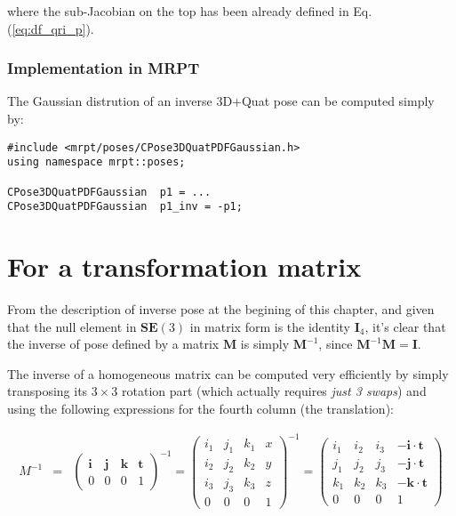\documentclass[a4paper,11pt]{report}
\begin{document}
\noindent where the sub-Jacobian on the top has been already defined in Eq.(\ref{eq:df_qri_p}).



\subsubsection{Implementation in MRPT}

The Gaussian distrution of an inverse 3D+Quat pose can be computed simply by:

\begin{lstlisting}
#include <mrpt/poses/CPose3DQuatPDFGaussian.h>
using namespace mrpt::poses;

CPose3DQuatPDFGaussian  p1 = ...
CPose3DQuatPDFGaussian  p1_inv = -p1;
\end{lstlisting}



\section{For a transformation matrix}
\label{sect:inverse:mat}

From the description of inverse pose at the begining of this chapter, and given
that the null element in $\mathbf{SE}(3)$ in matrix form is the identity $\mathbf{I}_4$,
it's clear that the inverse of pose defined by a matrix $\mathbf{M}$ is simply $\mathbf{M}^{-1}$,
since $\mathbf{M}^{-1}\mathbf{M}=\mathbf{I}$.

The inverse of a homogeneous matrix can be computed very efficiently by
simply transposing its $3 \times 3$ rotation part (which actually requires \emph{just 3 swaps})
and using the following expressions for the fourth column (the translation):

\begin{eqnarray}
M^{-1} &=&
\left(
  \begin{array}{ccc|c}
   \mathbf{i} & \mathbf{j} & \mathbf{k} & \mathbf{t} \\
\hline
   0 & 0 & 0 & 1
  \end{array}
\right) ^{-1}
=
\left(
  \begin{array}{ccc|c}
   i_1 & j_1 & k_1 & x \\
   i_2 & j_2 & k_2 & y \\
   i_3 & j_3 & k_3 & z \\
\hline
   0 & 0 & 0 & 1
  \end{array}
\right) ^{-1}
=
\left(
  \begin{array}{ccc|c}
   i_1 & i_2 & i_3   & -\mathbf{i} \cdot \mathbf{t} \\
   j_1 & j_2 & j_3   & -\mathbf{j} \cdot \mathbf{t} \\
   k_1 & k_2 & k_3   & -\mathbf{k} \cdot \mathbf{t} \\
\hline
   0 & 0 & 0 & 1
  \end{array}
\right)
\end{eqnarray}
\end{document}
